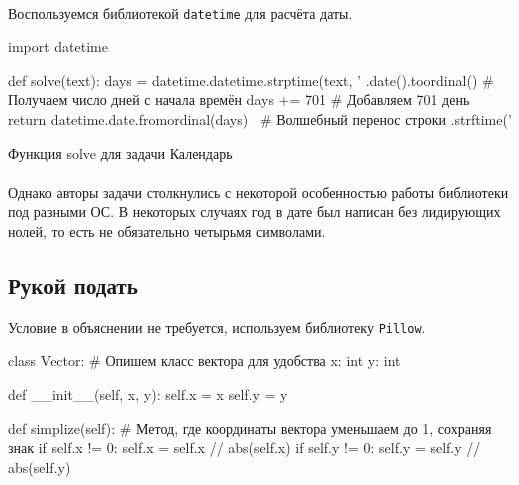 \documentclass[12pt]{article}
\begin{document}
    \paragraph{}
    Воспользуемся библиотекой \verb|datetime| для расчёта даты.
    \begin{listing}[H]
        \begin{pythoncode}
import datetime

def solve(text):
    days = datetime.datetime.strptime(text, '%
               .date().toordinal()                        # Получаем число дней с начала времён
    days += 701                                           # Добавляем 701 день
    return datetime.date.fromordinal(days) \              # Волшебный перенос строки
        .strftime('%
        \end{pythoncode}
        \label{lst:solve9}
        \caption{Функция solve для задачи Календарь}
    \end{listing}
    \paragraph{}
    Однако авторы задачи столкнулись с некоторой особенностью работы библиотеки под разными ОС.
    В некоторых случаях год в дате был написан без лидирующих нолей, то есть не обязательно четырьмя символами.

    \subsection{Рукой подать}
    Условие в объяснении не требуется, используем библиотеку \verb|Pillow|.

    \begin{pythoncode}
class Vector:               # Опишем класс вектора для удобства
    x: int
    y: int

    def __init__(self, x, y):
        self.x = x
        self.y = y

    def simplize(self):     # Метод, где координаты вектора уменьшаем до 1, сохраняя знак
        if self.x != 0: self.x = self.x // abs(self.x)
        if self.y != 0: self.y = self.y // abs(self.y)
    \end{pythoncode}
\end{document}
